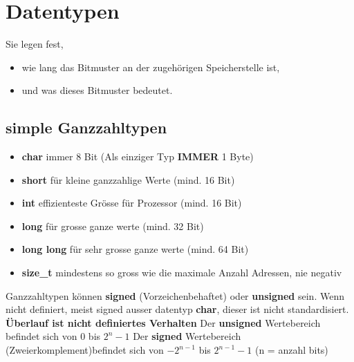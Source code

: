 \section{Datentypen}

Sie legen fest,

\begin{itemize}[itemsep=1pt, parsep=0pt]
    \item wie lang das Bitmuster an der zugehörigen Speicherstelle ist,
    \item und was dieses Bitmuster bedeutet.
\end{itemize}

\subsection{simple Ganzzahltypen}

\begin{itemize}[itemsep=1pt, parsep=0pt]
    \item \textbf{char} \newline immer 8 Bit (Als einziger Typ \textbf{IMMER} 1 Byte)
    \item \textbf{short} \newline für kleine ganzzahlige Werte (mind. 16 Bit)
    \item \textbf{int} \newline effizienteste Grösse für Prozessor (mind. 16 Bit)
    \item \textbf{long} \newline für grosse ganze werte (mind. 32 Bit)
    \item \textbf{long long} \newline für sehr grosse ganze werte (mind. 64 Bit)   
    \item \textbf{size\_t} \newline mindestens so gross wie die maximale Anzahl Adressen, nie negativ
\end{itemize}

Ganzzahltypen können \textbf{signed} (Vorzeichenbehaftet) oder \textbf{unsigned} sein. Wenn nicht definiert, meist signed ausser datentyp \textbf{char}, dieser ist nicht standardisiert.\newline
\textbf{Überlauf ist nicht definiertes Verhalten}\newline
Der \textbf{unsigned} Wertebereich befindet sich von 0 bis $2^n -1 $\newline
Der \textbf{signed} Wertebereich (Zweierkomplement)befindet sich von $-2^{n-1}$ bis $2^{n-1} -1 $\newline
(n = anzahl bits)

